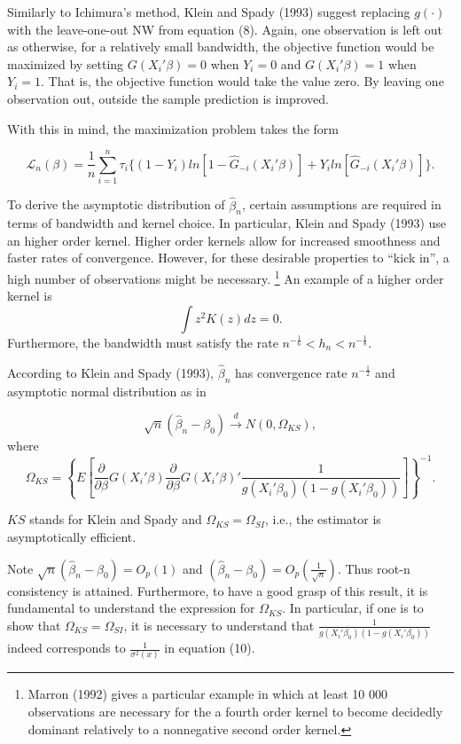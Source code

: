 \documentclass[a4paper]{article}
\begin{document}
Similarly to Ichimura's method, Klein and Spady (1993) suggest replacing $g(\cdot)$ with the leave-one-out NW from equation (8). Again, one observation is left out as otherwise, for a relatively small bandwidth, the objective function would be maximized by setting $G(X_i'\beta)=0$ when $Y_i=0$ and $G(X_i'\beta)=1$ when $Y_i=1$. That is, the objective function would take the value zero. By leaving one observation out, outside the sample prediction is improved. 

With this in mind, the maximization problem takes the form

\begin{equation}
\mathcal{L}_n(\beta) = \frac{1}{n}\sum_{i=1}^n \tau_{i}\{ (1 - Y_i)ln[ 1 - \hat{G}_{-i}(X_i'\beta)] +  Y_iln[\hat{G}_{-i}(X_i'\beta)]\}.
\end{equation}

To derive the asymptotic distribution of $\hat{\beta}_n$, certain assumptions are required in terms of bandwidth and kernel choice. In particular, Klein and Spady (1993) use an higher order kernel. Higher order kernels allow for increased smoothness and faster rates of convergence. However, for these desirable properties to ``kick in'', a high number of observations might be necessary. \footnote{Marron (1992) gives a particular example in which at least 10 000 observations are necessary for the a fourth order kernel to become decidedly dominant relatively to a nonnegative second order kernel.} An example of a higher order kernel is
\[\int z^{2}K(z)dz = 0.\]
Furthermore, the bandwidth must satisfy the rate $ n^{-\frac{1}{6}} < h_n < n^{-\frac{1}{8}}$.


\begin{theorem}
According to Klein and Spady (1993), $\hat{\beta}_{n}$ has convergence rate $n^{-\frac{1}{2}}$ and asymptotic normal distribution as in 

\[\sqrt{n}(\hat{\beta}_{n} - \beta_0) \stackrel{d}{\rightarrow} N(0,\Omega_{KS}),
\]
where \[ \Omega_{KS} = \left\{ E\left[\frac{\partial}{\partial \beta}
 G(X_i'\beta)\frac{\partial}{\partial \beta} G(X_i'\beta)'\frac{1}{g(X_i'\beta_0)(1 - g(X_i'\beta_0))} \right]\right\}^{-1}. \]
 
$KS$ stands for Klein and Spady and $\Omega_{KS} = \Omega_{SI}$, i.e., the estimator is asymptotically efficient.

\end{theorem}

Note $\sqrt{n}(\hat{\beta}_n - \beta_0)=O_p(1)$ and $(\hat{\beta}_n - \beta_0) = O_p\left(\frac{1}{\sqrt{n}}\right)$. Thus root-n consistency is attained. Furthermore, to have a good grasp of this result, it is fundamental to understand the expression for $\Omega_{KS}$. In particular, if one is to show that $\Omega_{KS} = \Omega_{SI}$, it is necessary to understand that $\frac{1}{g(X_i'\beta_0)(1 - g(X_i'\beta_0))}$ indeed corresponds to $\frac{1}{\sigma^2(x)}$ in equation (10). 
\end{document}
